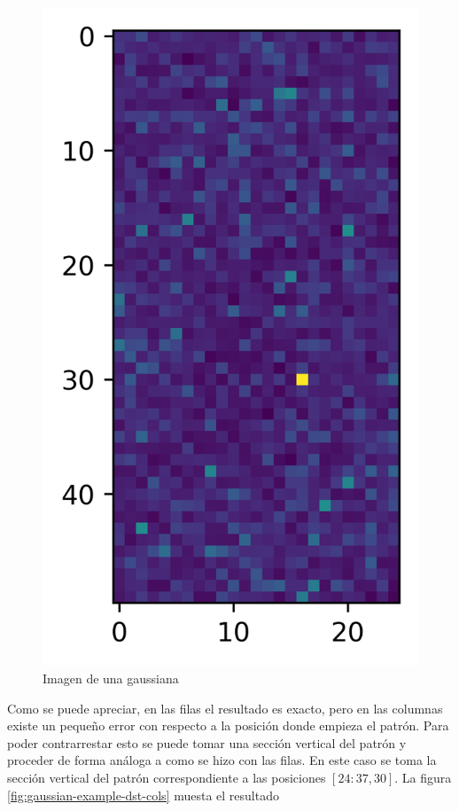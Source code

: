 \begin{figure}\label{fig:gaussian-example-dst-rows}
	\centering
	\includegraphics{Graphics/gaussian-example-dst-rows.png}
	\caption{Imagen de una gaussiana  }
\end{figure}

Como se puede apreciar, en las filas el resultado es exacto, pero en las columnas existe un pequeño error con respecto
a la posición donde empieza el patrón. Para poder contrarrestar esto se puede tomar una sección vertical del patrón
y proceder de forma análoga a como se hizo con las filas. En este caso se toma la sección vertical del patrón
correspondiente a las posiciones $[24:37, 30]$. La figura \ref{fig:gaussian-example-dst-cols} muesta el resultado

